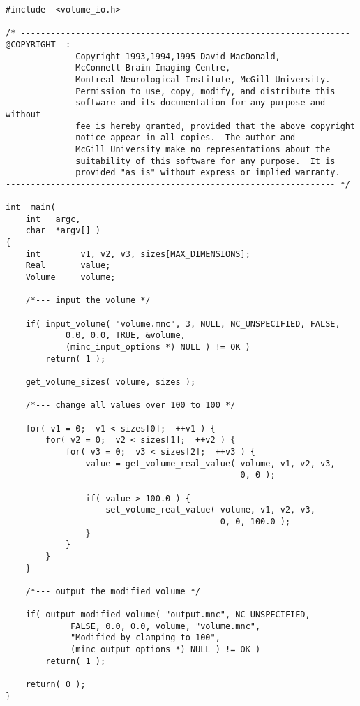 {\small
\begin{verbatim}
#include  <volume_io.h>

/* ------------------------------------------------------------------
@COPYRIGHT  :
              Copyright 1993,1994,1995 David MacDonald,
              McConnell Brain Imaging Centre,
              Montreal Neurological Institute, McGill University.
              Permission to use, copy, modify, and distribute this
              software and its documentation for any purpose and without
              fee is hereby granted, provided that the above copyright
              notice appear in all copies.  The author and
              McGill University make no representations about the
              suitability of this software for any purpose.  It is
              provided "as is" without express or implied warranty.
------------------------------------------------------------------ */

int  main(
    int   argc,
    char  *argv[] )
{
    int        v1, v2, v3, sizes[MAX_DIMENSIONS];
    Real       value;
    Volume     volume;

    /*--- input the volume */

    if( input_volume( "volume.mnc", 3, NULL, NC_UNSPECIFIED, FALSE,
            0.0, 0.0, TRUE, &volume,
            (minc_input_options *) NULL ) != OK )
        return( 1 );

    get_volume_sizes( volume, sizes );

    /*--- change all values over 100 to 100 */

    for( v1 = 0;  v1 < sizes[0];  ++v1 ) {
        for( v2 = 0;  v2 < sizes[1];  ++v2 ) {
            for( v3 = 0;  v3 < sizes[2];  ++v3 ) {
                value = get_volume_real_value( volume, v1, v2, v3,
                                               0, 0 );

                if( value > 100.0 ) {
                    set_volume_real_value( volume, v1, v2, v3,
                                           0, 0, 100.0 );
                }
            }
        }
    }

    /*--- output the modified volume */

    if( output_modified_volume( "output.mnc", NC_UNSPECIFIED,
             FALSE, 0.0, 0.0, volume, "volume.mnc",
             "Modified by clamping to 100",
             (minc_output_options *) NULL ) != OK )
        return( 1 );

    return( 0 );
}
\end{verbatim}
}


